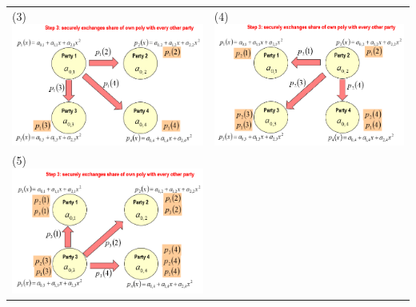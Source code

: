 \documentclass{book}
\begin{document}
\begin{tabularx}{0.99\textwidth}{X X}
	\\
	(3)\includegraphics[scale=0.4]{2022-01-02-15-59-59.png}%
	 &
	(4)\includegraphics[scale=0.4]{2022-01-02-16-00-20.png}%
	\\
	(5)\includegraphics[scale=0.4]{2022-01-02-16-04-23.png}%

\end{tabularx}
\end{document}
